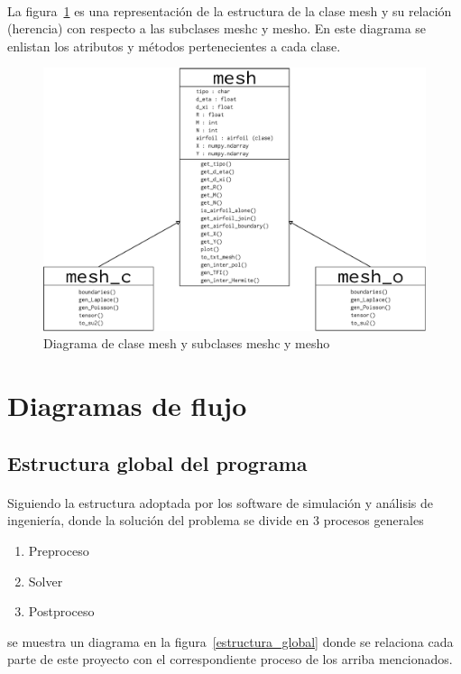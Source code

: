 \documentclass[letterpaper, openright, 12pt]{book}
\begin{document}
    \paragraph*{}
        La figura~\ref{mesh_class} es una representación de la estructura de la
        clase mesh y su relación (herencia) con respecto a las subclases
        mesh\textunderscore c y mesh\textunderscore o. En este diagrama se
        enlistan los atributos y métodos pertenecientes a cada clase.
    \begin{figure}
        \centering
        \includegraphics[keepaspectratio, width=205mm]{./Imagenes/mesh_class}
        \caption{Diagrama de clase mesh y subclases mesh\textunderscore c y
            mesh\textunderscore o}
        \label{mesh_class}
    \end{figure}

    \section{Diagramas de flujo}

    \subsection{Estructura global del programa}
    \paragraph*{}
        Siguiendo la estructura adoptada por los software de simulación y
        análisis de ingeniería, donde la solución del problema se divide en 3
        procesos generales
        \begin{enumerate}
            \item Preproceso
            \item Solver
            \item Postproceso
        \end{enumerate}
        se muestra un diagrama en la figura~\ref{estructura_global} donde se
        relaciona cada parte de este proyecto con el correspondiente proceso de
        los arriba mencionados.
\end{document}

